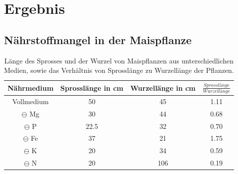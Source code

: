 \documentclass[10pt,a4paper]{article}
\begin{document}
	\section{Ergebnis}
		\subsection{Nährstoffmangel in der Maispflanze}
		
		\begin{table}[H]
			\centering
			\caption{Länge des Sprosses und der Wurzel von Maispflanzen aus unterschiedlichen Medien, sowie das Verhältnis von Sprosslänge zu Wurzellänge der Pflanzen.}
			\label{tab:Verhältnis}
			\begin{tabular}{cccc}
				\toprule
				Nährmedium & Sprosslänge in cm & Wurzellänge in cm & $\frac{Sprosslänge}{Wurzellänge}$\\
				\midrule
				Vollmedium & 50 & 45 & 1.11\\
				$\ominus$ Mg & 30 & 44 & 0.68\\
				$\ominus$ P & 22.5 & 32 & 0.70\\
				$\ominus$ Fe & 37 & 21 & 1.75 \\
				$\ominus$ K & 20 & 34 & 0.59\\
				$\ominus$ N & 20 & 106 & 0.19\\
				\bottomrule
			\end{tabular}
		\end{table}	
		
		
		
\end{document}

